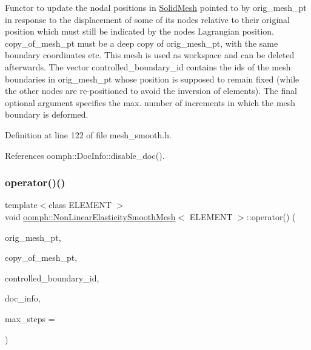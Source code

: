 Functor to update the nodal positions in \hyperlink{classoomph_1_1SolidMesh}{Solid\+Mesh} pointed to by orig\+\_\+mesh\+\_\+pt in response to the displacement of some of its nodes relative to their original position which must still be indicated by the nodes\textquotesingle{} Lagrangian position. copy\+\_\+of\+\_\+mesh\+\_\+pt must be a deep copy of orig\+\_\+mesh\+\_\+pt, with the same boundary coordinates etc. This mesh is used as workspace and can be deleted afterwards. The vector controlled\+\_\+boundary\+\_\+id contains the ids of the mesh boundaries in orig\+\_\+mesh\+\_\+pt whose position is supposed to remain fixed (while the other nodes are re-\/positioned to avoid the inversion of elements). The final optional argument specifies the max. number of increments in which the mesh boundary is deformed. 



Definition at line 122 of file mesh\+\_\+smooth.\+h.



References oomph\+::\+Doc\+Info\+::disable\+\_\+doc().

\mbox{\label{classoomph_1_1NonLinearElasticitySmoothMesh_a426905484f20903c02c995b297df36a6}} 
\subsubsection{\texorpdfstring{operator()()}{operator()()}\hspace{0.1cm}{\footnotesize\ttfamily [2/2]}}
{\footnotesize\ttfamily template$<$class E\+L\+E\+M\+E\+NT $>$ \\
void \hyperlink{classoomph_1_1NonLinearElasticitySmoothMesh}{oomph\+::\+Non\+Linear\+Elasticity\+Smooth\+Mesh}$<$ E\+L\+E\+M\+E\+NT $>$\+::operator() (\begin{DoxyParamCaption}\item[{\hyperlink{classoomph_1_1SolidMesh}{Solid\+Mesh} $\ast$}]{orig\+\_\+mesh\+\_\+pt,  }\item[{\hyperlink{classoomph_1_1SolidMesh}{Solid\+Mesh} $\ast$}]{copy\+\_\+of\+\_\+mesh\+\_\+pt,  }\item[{const \hyperlink{classoomph_1_1Vector}{Vector}$<$ unsigned $>$ \&}]{controlled\+\_\+boundary\+\_\+id,  }\item[{\hyperlink{classoomph_1_1DocInfo}{Doc\+Info}}]{doc\+\_\+info,  }\item[{const unsigned \&}]{max\+\_\+steps = {} }\end{DoxyParamCaption})\hspace{0.3cm}{\ttfamily [inline]}}



